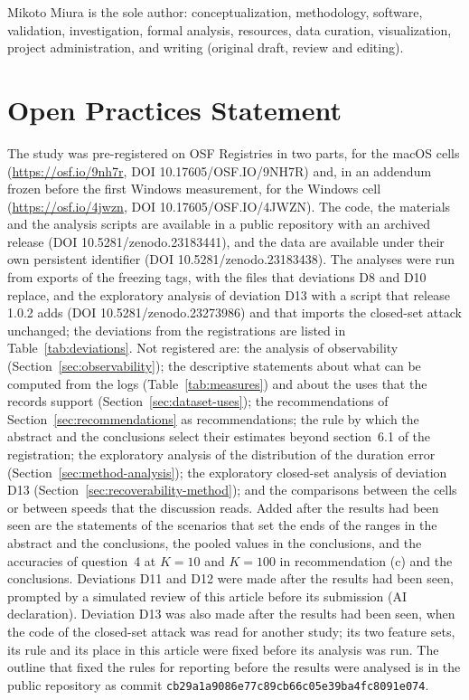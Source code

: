 Mikoto Miura is the sole author: conceptualization, methodology, software, validation, investigation, formal analysis,
resources, data curation, visualization, project administration, and writing (original draft, review and editing).

\section*{Open Practices Statement}

The study was pre-registered on OSF Registries in two parts, for the macOS cells (\url{https://osf.io/9nh7r},
DOI 10.17605/OSF.IO/9NH7R) and, in an addendum frozen before the first Windows measurement, for the Windows cell
(\url{https://osf.io/4jwzn}, DOI 10.17605/OSF.IO/4JWZN). The code, the materials and the analysis scripts are available
in a public repository with an archived release (DOI 10.5281/zenodo.23183441), and the data are available under their
own persistent identifier (DOI 10.5281/zenodo.23183438). The analyses were run from exports of the freezing tags, with
the files that deviations D8 and D10 replace, and the exploratory analysis of deviation D13 with a script that
release 1.0.2 adds (DOI 10.5281/zenodo.23273986) and that imports the closed-set attack unchanged; the deviations from
the registrations are listed in
Table~\ref{tab:deviations}. Not registered are: the analysis of observability (Section~\ref{sec:observability}); the
descriptive statements about what can be computed from the logs (Table~\ref{tab:measures}) and about the uses that the
records support (Section~\ref{sec:dataset-uses}); the recommendations of Section~\ref{sec:recommendations} as
recommendations; the rule by which the abstract and the conclusions select their estimates beyond section~6.1 of the
registration; the exploratory analysis of the distribution of the duration error (Section~\ref{sec:method-analysis});
the exploratory closed-set analysis of deviation D13 (Section~\ref{sec:recoverability-method}); and the comparisons
between the cells or between speeds that the discussion reads. Added after the results had been
seen are the statements of the scenarios that set the ends of the ranges in the abstract and the conclusions, the
pooled values in the conclusions, and the accuracies of question~4 at $K = 10$ and $K = 100$ in recommendation (c) and
the conclusions. Deviations D11 and D12 were made after
the results had been seen, prompted by a simulated review of this article before its submission (AI declaration).
Deviation D13 was also made after the results had been seen, when the code of the closed-set attack was read for
another study; its two feature sets, its rule and its place in this article were fixed before its analysis was run.
The outline that fixed the rules for reporting before the results were analysed is in the public repository as commit
\texttt{cb29a1a9086e77c89cb66c05e39ba4fc8091e074}.

